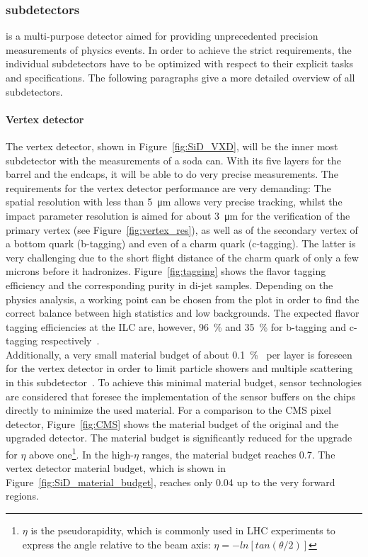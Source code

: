 \subsubsection{\sid subdetectors}
\label{ILC:SiD:subdetectors}
\sid is a multi-purpose detector aimed for providing unprecedented precision measurements of physics events.
In order to achieve the strict \sid requirements, the individual subdetectors have to be optimized with respect to their explicit tasks and specifications.
The following paragraphs give a more detailed overview of all \sid subdetectors.

\paragraph{Vertex detector}
The vertex detector, shown in Figure~\ref{fig:SiD_VXD}, will be the inner most subdetector with the measurements of a soda can.
With its five layers for the barrel and the endcaps, it will be able to do very precise measurements.
The requirements for the vertex detector performance are very demanding:
The spatial resolution with less than \SI{5}{\micro\meter} allows very precise tracking, whilst the impact parameter resolution is aimed for about \SI{3}{\micro\meter} for the verification of the primary vertex (see Figure~\ref{fig:vertex_res}), as well as of the secondary vertex of a bottom quark (b-tagging) and even of a charm quark (c-tagging).
The latter is very challenging due to the short flight distance of the charm quark of only a few microns before it hadronizes.
Figure~\ref{fig:tagging} shows the flavor tagging efficiency and the corresponding purity in di-jet samples.
Depending on the physics analysis, a working point can be chosen from the plot in order to find the correct balance between high statistics and low backgrounds.
The expected flavor tagging efficiencies at the ILC are, however, \SI{96}{\percent} and \SI{35}{\percent} for b-tagging and c-tagging respectively~\cite[p. 54]{TDR2}.
\\Additionally, a very small material budget of about \SI{0.1}{\percent\xzero} per layer is foreseen for the vertex detector in order to limit particle showers and multiple scattering in this subdetector~\cite{SiD_Update,Marcels_general_SiD_slides}.
To achieve this minimal material budget, sensor technologies are considered that foresee the implementation of the sensor buffers on the chips directly to minimize the used material. 
For a comparison to the CMS pixel detector, Figure~\ref{fig:CMS} shows the material budget of the original and the upgraded detector.
The material budget is significantly reduced for the upgrade for $\eta$ above one\footnote{$\eta$ is the pseudorapidity, which is commonly used in LHC experiments to express the angle relative to the beam axis: $\eta=-ln[tan(\theta/2)]$}.
In the high-$\eta$ ranges, the material budget reaches \SI{0.7}{\xzero}.
The \sid vertex detector material budget, which is shown in Figure~\ref{fig:SiD_material_budget}, reaches only \SI{0.04}{\xzero} up to the very forward regions.

